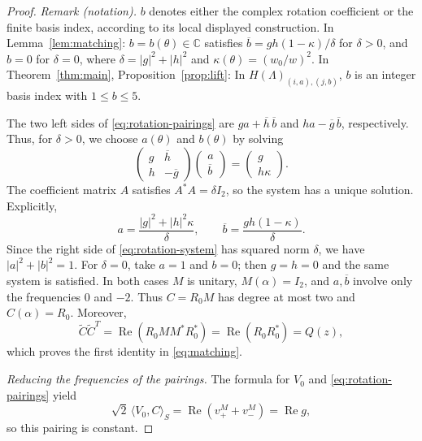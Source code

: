 \begin{proof}
\noindent\textit{Remark (notation).} $b$ denotes either the complex rotation coefficient or the finite basis index, according to its local displayed construction. In Lemma~\ref{lem:matching}: $b=b(\theta)\in\mathbb C$ satisfies $\overline b=gh(1-\kappa)/\delta$ for $\delta>0$, and $b=0$ for $\delta=0$, where $\delta=|g|^2+|h|^2$ and $\kappa(\theta)=(w_0/w)^2$. In Theorem~\ref{thm:main}, Proposition~\ref{prop:lift}: In $H(\Lambda)_{(i,a),(j,b)}$, $b$ is an integer basis index with $1\leq b\leq5$.


The two left sides of \eqref{eq:rotation-pairings} are
$ga+\overline h\,\overline b$ and
$ha-\overline g\,\overline b$, respectively.  Thus, for $\delta>0$,
we choose $a(\theta)$ and $b(\theta)$ by solving
\begin{equation}\label{eq:rotation-system}
 \begin{pmatrix}g&\overline h\\h&-\overline g\end{pmatrix}
 \begin{pmatrix}a\\\overline b\end{pmatrix}
 =\begin{pmatrix}g\\h\kappa\end{pmatrix}.
\end{equation}
The coefficient matrix $A$ satisfies $A^*A=\delta I_2$, so the
system has a unique solution.  Explicitly,
\begin{equation}\label{eq:rotation-coefficients}
 a=\frac{|g|^2+|h|^2\kappa}{\delta},\qquad
 \overline b=\frac{gh(1-\kappa)}{\delta}.
\end{equation}
Since the right side of \eqref{eq:rotation-system} has squared norm
$\delta$, we have $|a|^2+|b|^2=1$.
For $\delta=0$, take $a=1$ and $b=0$; then $g=h=0$ and the same
system is satisfied.  In both cases $M$ is unitary,
$M(\alpha)=I_2$, and $a,\overline b$ involve only the
frequencies $0$ and $-2$.  Thus $C=R_0M$ has degree at most two and
$C(\alpha)=R_0$.  Moreover,
\[
 \widetilde C\widetilde C^T
 =\operatorname{Re}(R_0MM^*R_0^*)
 =\operatorname{Re}(R_0R_0^*)=Q(z),
\]
which proves the first identity in \eqref{eq:matching}.

\smallskip
\noindent\emph{Reducing the frequencies of the pairings.}
The formula for $V_0$ and \eqref{eq:rotation-pairings} yield
\[
 \sqrt2\,\langle V_0,C\rangle_S
 =\operatorname{Re}(v^M_++v^M_-)=\operatorname{Re}g,
\]
so this pairing is constant.


\end{proof}
